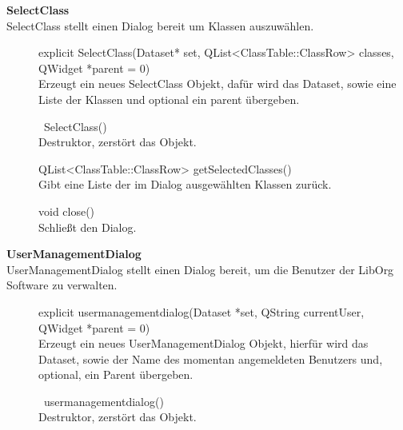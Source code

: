 \textbf{SelectClass}\\
SelectClass stellt einen Dialog bereit um Klassen auszuwählen.
\begin{description}
	\item[ ] explicit SelectClass(Dataset* set, QList<ClassTable::ClassRow> classes, QWidget *parent = 0) \\
	Erzeugt ein neues SelectClass Objekt, dafür wird das Dataset, sowie eine Liste der Klassen und optional ein parent übergeben.
  	\item[ ] ~SelectClass() \\
	Destruktor, zerstört das Objekt.
  	\item[ ] QList<ClassTable::ClassRow> getSelectedClasses() \\
	Gibt eine Liste der im Dialog ausgewählten Klassen zurück.
	\item[ ] void close() \\
	Schließt den Dialog.
\end{description}

\textbf{UserManagementDialog}\\
UserManagementDialog stellt einen Dialog bereit, um die Benutzer der LibOrg Software zu verwalten.
\begin{description}
	\item[ ] explicit usermanagementdialog(Dataset *set, QString currentUser, QWidget *parent = 0) \\
	Erzeugt ein neues UserManagementDialog Objekt, hierfür wird das Dataset, sowie der Name des momentan angemeldeten Benutzers und, optional, ein Parent übergeben.
  	\item[ ] ~usermanagementdialog() \\
	Destruktor, zerstört das Objekt.
\end{description}

